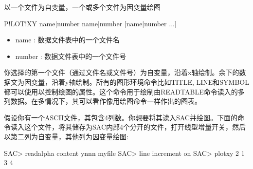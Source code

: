 \label{cmd:plotxy}

以一个文件为自变量，一个或多个文件为因变量绘图

\begin{SACSTX}
P!LOT!XY name|number name|number [name|number ...]
\end{SACSTX}

\begin{itemize}
\item name : 数据文件表中的一个文件名 
\item number : 数据文件表中的一个文件号 
\end{itemize}

你选择的第一个文件（通过文件名或文件号）为自变量，沿着x轴绘制。余下的数据文为因变量，沿着y轴绘制。所有的图形环境命令比如TITLE, LINE和SYMBOL都可以使用以控制绘图的属性。这个命令用于绘制由READTABLE命令读入的多列数据。在多情况下，其可以看作像用绘图命令一样作出的图表。

假设你有一个ASCII文件，其包含4列数。你想要将其读入SAC并绘图。下面的命令读入这个文件，将其储存为SAC内部4个分开的文件，打开线型增量开关，然后以第二列为自变量，其他列为因变量绘图:
\begin{SACCode}
SAC> readalpha content ynnn myfile
SAC> line increment on
SAC> plotxy 2 1 3 4
\end{SACCode}
